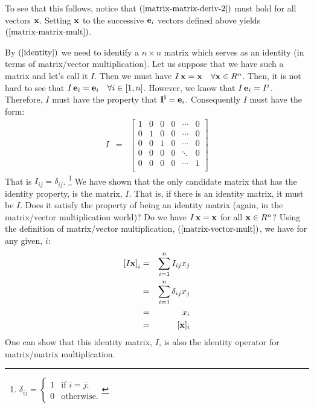 \documentclass{article}
\begin{document}
To see that this follows, notice that $(\ref{matrix-matrix-deriv-2})$ must hold for all
vectors ${\bf x}$. Setting ${\bf x}$ to the successive ${\bf e}_i$ vectors defined
above yields $(\ref{matrix-matrix-mult})$.


By $(\ref{identity})$ we need to identify a $n \times n$ matrix which serves as an
identity (in terms of matrix/vector multiplication).
Let us suppose that we have such a matrix and let's call it $I$.
Then we must have $I \, {\bf x} = {\bf x} \quad \forall {\bf x} \in R^n$. 
Then, it is not hard
to see that $I \, {\bf e}_{i} = {\bf e}_i \quad \forall i \in [1, n]$. 
However, we know that $I \, {\bf e}_i = I^i$. Therefore, $I$
must have the property that ${\bf I^i} = {\bf e}_i$. Consequently $I$ must have the form:
\begin{eqnarray}
  I & = & \left[
      \begin{array}{cccccc}
        1 & 0 & 0 & 0 & \cdots & 0 \\
        0 & 1 & 0 & 0 & \cdots & 0 \\
        0 & 0 & 1 & 0 & \cdots & 0 \\
        0 & 0 & 0 & 0 & \ddots & 0 \\
        0 & 0 & 0 & 0 & \cdots & 1 \\
      \end{array}
  \right]
\end{eqnarray}
That is $I_{ij} = \delta_{ij}$.%
\footnote{$\delta_{ij} = \left\{\begin{array}{ll}
                                 1 & \text{if $i = j$;} \\
                                 0 & \text{otherwise.}
                               \end{array} \right.$}
We have shown that the only candidate matrix that has the identity property, is the
matrix, $I$. That is, if there is an identity matrix, it must be $I$. Does it satisfy
the property of being an identity matrix (again, in the matrix/vector multiplication world)?
Do we have $I \, {\bf x} = {\bf x}$ for all ${\bf x} \in R^n$?
Using the definition of matrix/vector multiplication, $(\ref{matrix-vector-mult})$, we
have for any given, $i$:
\begin{eqnarray}
  \left[I {\bf x}\right]_i & = & \sum_{i=1}^n I_{ij} x_j \nonumber \\
                           & = & \sum_{i=1}^n \delta_{ij} x_j \nonumber \\
                           & = & x_i \nonumber \\
                           & = & [{\bf x}]_i
\end{eqnarray}
One can show that this identity matrix, $I$, is also the identity operator for
matrix/matrix multiplication.
\end{document}
